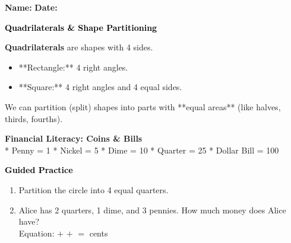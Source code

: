 \documentclass[12pt, letterpaper, fleqn]{article}
\newcommand{\blank}{\underline{\hspace{2.2cm}}}
\begin{document}
\textbf{Name:} \underline{\hspace{5cm}}
\hfill
\textbf{Date:} \underline{\hspace{3cm}}\\

\begin{tcolorbox}[colback=customteal!20]
    \large\textcolor{black}{\textbf{Quadrilaterals & Shape Partitioning}}
\end{tcolorbox}

\vspace{3mm}
\noindent
\textbf{Quadrilaterals} are shapes with 4 sides. 
\begin{itemize}
    \item **Rectangle:** 4 right angles.
    \item **Square:** 4 right angles and 4 equal sides.
\end{itemize}
We can partition (split) shapes into parts with **equal areas** (like halves, thirds, fourths).

\vspace{3mm}
\begin{tcolorbox}[colback=white, colframe=black!25, boxrule=0.6pt, arc=4mm]
\textbf{Financial Literacy: Coins & Bills}
\\
* Penny = 1
* Nickel = 5
* Dime = 10
* Quarter = 25
* Dollar Bill = 100
\end{tcolorbox}

\newpage
\begin{tcolorbox}[colback=customteal!20]
    \large\textcolor{black}{\textbf{Guided Practice}}
\end{tcolorbox}

\vspace{5mm}
\begin{enumerate}[itemsep=3cm, leftmargin=0.6cm]
\item Partition the circle into 4 equal quarters.
\begin{center}
\end{center}

\item Alice has 2 quarters, 1 dime, and 3 pennies. How much money does Alice have?
\\
Equation: \blank $+$ \blank $+$ \blank $=$ \blank cents
\end{enumerate}
\end{document}
